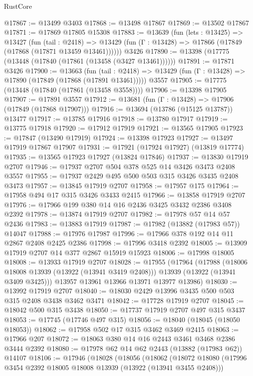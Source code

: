 \begin{lexlean}{RustCore}
\begin{coremodule}
@17867 := @13499 @3403
@17868 := @13498 @17867
@17869 := @13502 @17867
@17871 := @17869 @17805 @15308
@17883 := @13639
    (fun (lets : @13425) =>
    @13427
      (fun (tail : @2418) =>
      @13429 (fun (Γ : @13428) => @17866 (@17849 (@17868 (@17871 @13459 @13461))))))
    @3426
@17890 := @13398 (@17775 (@13448 (@17840 (@17861 (@13458 (@3427 @13461))))))
@17891 := @17871 @3426
@17900 := @13663
    (fun (tail : @2418) => @13429 (fun (Γ : @13428) => @17890 (@17849 (@17868 (@17891 @13461)))))
    @3557
@17905 := @17775 (@13448 (@17840 (@17861 (@13458 @3558))))
@17906 := @13398 @17905
@17907 := @17891 @3557
@17912 := @13681 (fun (Γ : @13428) => @17906 (@17849 (@17868 @17907)))
@17916 := @13694 (@13786 (@15125 @13787)) @13477
@17917 := @13785 @17916
@17918 := @13780 @17917
@17919 := @13775 @17918
@17920 := @17912 @17919
@17921 := @13565 @17905
@17923 := @17847 (@13490 @17919)
@17924 := @13398 @17923
@17927 := @13497 @17919 @17867 @17907
@17931 := @17921 (@17924 @17927) (@13819 @17774)
@17935 := @13565 @17923 @17927 (@13824 @17846)
@17937 := @13830 @17919 @2707
@17946 := @17937 @2707 @504 @378 @525 @14 @3426 @3473 @2408 @3557
@17955 := @17937 @2429 @495 @500 @503 @315 @3426 @3435 @2408 @3473
@17957 := @13845 @17919 @2707
@17958 := @17957 @175
@17964 := @17958 @494 @17 @315 @3426 @3433 @2415
@17966 := @13858 @17919 @2707
@17976 := @17966 @199 @380 @14 @16 @2436 @3425 @3432 @2386 @3408 @2392
@17978 := @13874 @17919 @2707
@17982 := @17978 @57 @14 @57 @2436
@17983 := @13883 @17919
@17987 := @17982 (@13882 (@17983 @57)) @14047
@17988 := @17976 @17987
@17996 := @17966 @378 @192 @14 @11 @2867 @2408 @2425 @2386
@17998 := @17996 @3418 @2392
@18005 := @13909 @17919 @2707 @14 @377 @2867 @15919 @15923
@18006 := @17998 @18005
@18008 := @13933 @17919 @2707
@18028 := @17955
    (@17964
      (@17988
        (@18006 @18008 @13939 (@13922 (@13941 @3419 @2408)))
        @13939
        (@13922 (@13941 @3409 @3425)))
      @13957
      @13961
      @13966
      @13971
      @13977
      @13986)
@18030 := @13992 @17919 @2707
@18040 := @18030 @2429 @13996 @3435 @500 @503 @315 @2408 @3438 @3462 @3471
@18042 := @17728 @17919 @2707
@18045 := @18042 @500 @315 @3438
@18050 := @17737 @17919 @2707 @497 @315 @3437
@18053 := @17745 (@17746 @497 @315)
@18056 := @18040 (@18045 (@18050 @18053))
@18062 := @17958 @502 @17 @315 @3462 @3469 @2415
@18063 := @17966 @207
@18072 := @18063 @380 @14 @16 @2443 @3461 @3468 @2386 @3444 @2392
@18080 := @17978 @62 @14 @62 @2443 (@13882 (@17983 @62)) @14107
@18106 := @17946
    (@18028
      (@18056
        (@18062
          (@18072
            @18080
            (@17996 @3454 @2392 @18005 @18008 @13939 (@13922 (@13941 @3455 @2408)))

\end{coremodule}
\end{lexlean}
